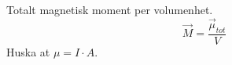 Totalt magnetisk moment per volumenhet.
$$\vec{M} = \frac{\vec{\mu}_{tot}}{V}$$
Huska at $\mu = I\cdot A$.
